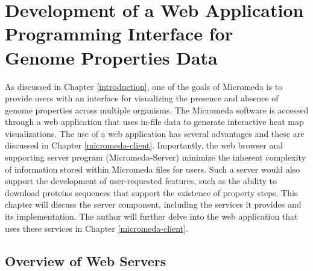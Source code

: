 \chapter{Development of a Web Application Programming Interface for Genome Properties Data} \label{micromeda-server}

As discussed in Chapter \ref{introduction}, one of the goals of Micromeda is to provide users with an interface for visualizing the presence and absence of genome properties across multiple organisms. The Micromeda software is accessed through a web application that uses in-file data to generate interactive heat map visualizations. The use of a web application has several advantages and these are discussed in Chapter \ref{micromeda-client}. Importantly, the web browser and supporting server program (Micromeda-Server) minimize the inherent complexity of information stored within Micromeda files for users. Such a server would also support the development of user-requested features, such as the ability to download proteins sequences that support the existence of property steps. This chapter will discuss the server component, including the services it provides and its implementation. The author will further delve into the web application that uses these services in Chapter \ref{micromeda-client}.

\section{Overview of Web Servers} \label{web-servers}

